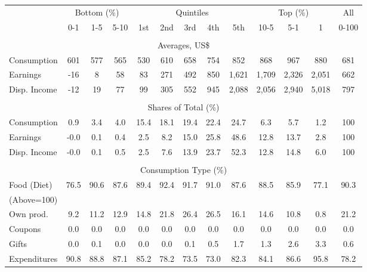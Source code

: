\begin{tabular}{l c c c| c c c c c| c c c| c}
\toprule
&\multicolumn{3}{c|}{Bottom (\%)} & \multicolumn{5}{c|}{Quintiles} & \multicolumn{3}{c|}{Top (\%)} & All  \\
& 0-1 & 1-5 & 5-10 &  1st & 2nd & 3rd & 4th & 5th & 10-5 & 5-1 & 1 & 0-100 \\
\midrule \\
\multicolumn{13}{c}{Averages, US\$} \\
\midrule
Consumption  & 601  & 577  & 565  & 530  & 610  & 658  & 754  & 852  & 868  & 967  & 880  & 681 \\
Earnings         & -16 & 8 & 58 & 83 & 271 & 492 & 850 & 1,621 & 1,709 & 2,326 & 2,051 & 662 \\
Disp. Income & -12 & 19 & 77 & 99 & 305 & 552 & 945 & 2,088 & 2,056 & 2,940 & 5,018 & 797 \\
\midrule \\
\multicolumn{13}{c}{Shares of Total (\%)} \\
\midrule
Consumption  & 0.9   & 3.4   & 4.0   & 15.4   & 18.1   & 19.4   & 22.4   & 24.7   & 6.3   & 5.7   & 1.2   & 100 \\
Earnings         & -0.0  & 0.1  & 0.4  & 2.5  & 8.2  & 15.0  & 25.8  & 48.6  & 12.8  & 13.7  & 2.8  & 100 \\
Disp. Income & -0.0  & 0.1  & 0.5  & 2.5  & 7.6  & 13.9  & 23.7  & 52.3  & 12.8  & 14.8  & 6.0  & 100 \\
\midrule \\
\multicolumn{13}{c}{Consumption Type (\%)}  \\
\midrule
Food (Diet)  & 76.5 & 90.6 & 87.6 & 89.4 & 92.4 & 91.7 & 91.0 & 87.6 & 88.5 & 85.9 & 77.1 & 90.3 \\
(Above=100) & & & & & & & & & & & &  \\
\hspace{.3cm} Own prod.  & 9.2 & 11.2 & 12.9 & 14.8 & 21.8 & 26.4 & 26.5 & 16.1 & 14.6 & 10.8 & 0.8 & 21.2 \\
\hspace{.3cm} Coupons    & 0.0 & 0.0 & 0.0 & 0.0 & 0.0 & 0.0 & 0.0 & 0.0 & 0.0 & 0.0 & 0.0 & 0.0 \\
\hspace{.3cm} Gifts      & 0.0 & 0.1 & 0.0 & 0.0 & 0.0 & 0.1 & 0.5 & 1.7 & 1.3 & 2.6 & 3.3 & 0.6 \\
\hspace{.3cm} Expenditures  & 90.8 & 88.8 & 87.1 & 85.2 & 78.2 & 73.5 & 73.0 & 82.3 & 84.1 & 86.6 & 95.8 & 78.2 \\

\end{tabular}
